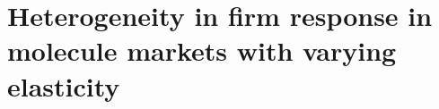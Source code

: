 \documentclass[aspectratio=43]{beamer}
\begin{document}

\section{Heterogeneity in firm response in molecule markets with varying elasticity}
\end{document}
